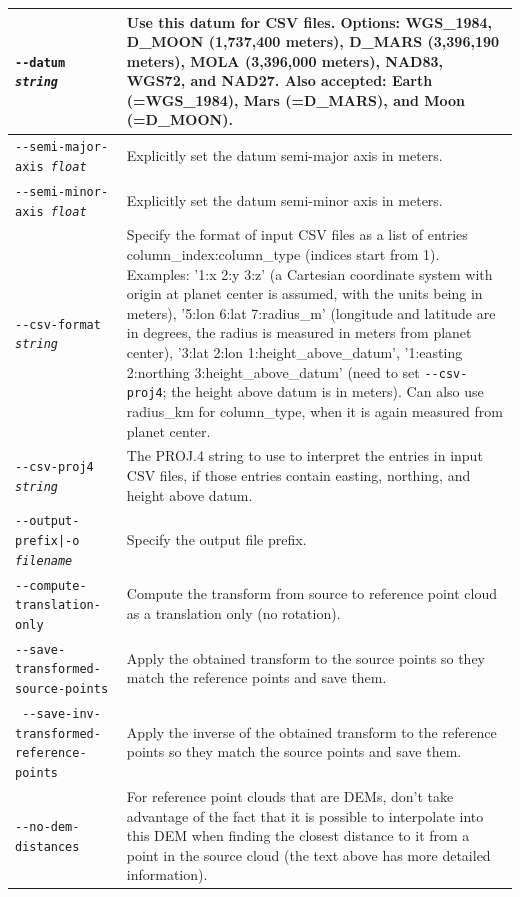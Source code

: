 \begin{longtable}{|p{8cm}|p{9cm}|}
\texttt{-\/-datum \textit{string}} & Use this datum for CSV files. Options: WGS\_1984, D\_MOON (1,737,400 meters), D\_MARS (3,396,190 meters), MOLA (3,396,000 meters), NAD83, WGS72, and NAD27. Also accepted: Earth (=WGS\_1984), Mars (=D\_MARS), and Moon (=D\_MOON). \\ \hline

\texttt{-\/-semi-major-axis \textit{float}} & Explicitly set the datum semi-major axis in meters.\\ \hline
\texttt{-\/-semi-minor-axis \textit{float}} & Explicitly set the datum semi-minor axis in meters.\\ \hline

\texttt{-\/-csv-format \textit{string}} & Specify the format of input
CSV files as a list of entries column\_index:column\_type (indices start
from 1). Examples: '1:x 2:y 3:z' (a Cartesian coordinate system with
origin at planet center is assumed, with the units being in meters),
'5:lon 6:lat 7:radius\_m' (longitude and latitude are in degrees, the
radius is measured in meters from planet center), '3:lat 2:lon
1:height\_above\_datum', '1:easting 2:northing 3:height\_above\_datum'
(need to set \texttt{-\/-csv-proj4}; the height above datum is in
meters). Can also use radius\_km for column\_type, when it is again
measured from planet center. \\ \hline

\texttt{-\/-csv-proj4 \textit{string}} & The PROJ.4 string to use to
interpret the entries in input CSV files, if those entries contain
easting, northing, and height above datum. \\ \hline

\texttt{-\/-output-prefix|-o \textit{filename}} & Specify the output file prefix. \\ \hline
\texttt{-\/-compute-translation-only} & Compute the transform from source to reference point cloud as a translation only (no rotation). \\ \hline
\texttt{-\/-save-transformed-source-points} & Apply the obtained transform to the source points so they match the reference points and save them. \\ \hline
\texttt{ -\/-save-inv-transformed-reference-points} & Apply the inverse of the obtained transform to the reference points so they match the source points and save them.
\\ \hline

\texttt{-\/-no-dem-distances} & For reference point clouds that are DEMs, don't take advantage of the fact that it is possible to interpolate into this DEM when finding the closest distance to it from a point in the source cloud (the text above has more detailed information). \\ \hline


\end{longtable}
